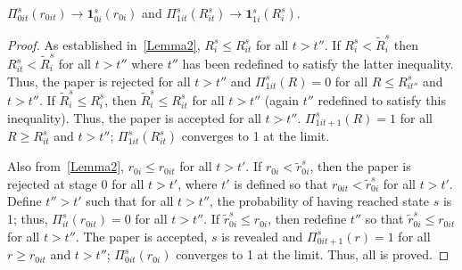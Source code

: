\begin{lemma}\label{Lemma3}
$\Pi_{0it}^s(r_{0it})\rightarrow\bm 1_{0i}^s(r_{0i})$ and $\Pi_{1it}^s(R_{it}^s)\rightarrow\bm 1_{1i}^s(R_i^s)$.
\end{lemma}
\begin{proof}
As established in~\autoref{Lemma2}, $R_i^s\le R_{it}^s$ for all $t>t''$. If $R_i^s<\widetilde R_i^s$ then $R_{it}^s<\widetilde R_i^s$ for all $t>t''$ where $t''$ has been redefined to satisfy the latter inequality. Thus, the paper is rejected for all $t>t''$ and $\Pi_{1it}^s(R)=0$ for all $R\le R_{it''}^s$ and $t>t''$. If $\widetilde R_i^s\le R_i^s$, then $\widetilde R_i^s\le R_{it}^s$ for all $t>t''$ (again $t''$ redefined to satisfy this inequality). Thus, the paper is accepted for all $t>t''$. $\Pi_{1it+1}^s(R)=1$ for all $R\ge R_{it}^s$ and $t>t''$; $\Pi_{1it}^s(R_{it}^s)$ converges to 1 at the limit.

Also from~\autoref{Lemma2}, $r_{0i}\le r_{0it}$ for all $t>t'$. If $r_{0i}<\widetilde r_{0i}^s$, then the paper is rejected at stage 0 for all $t>t'$, where $t'$ is defined so that $r_{0it}<\widetilde r_{0i}^s$ for all $t>t'$. Define $t''>t'$ such that for all $t>t''$, the probability of having reached state $s$ is 1; thus, $\Pi_{it}^s(r_{0it})=0$ for all $t>t''$. If $\widetilde r_{0i}^s\le r_{0i}$, then redefine $t''$ so that $\widetilde r_{0i}^s\le r_{0it}$ for all $t>t''$. The paper is accepted, $s$ is revealed and $\Pi_{0it+1}^s(r)=1$ for all $r\ge r_{0it}$ and $t>t''$; $\Pi_{0it}^s(r_{0i})$ converges to 1 at the limit. Thus, all is proved.
\end{proof}

